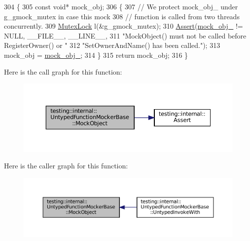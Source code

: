\begin{DoxyCode}
304                                         \{
305   \textcolor{keyword}{const} \textcolor{keywordtype}{void}* mock\_obj;
306   \{
307     \textcolor{comment}{// We protect mock\_obj\_ under g\_gmock\_mutex in case this mock}
308     \textcolor{comment}{// function is called from two threads concurrently.}
309     \hyperlink{namespacetesting_1_1internal_a08b187c6cc4e28400aadf9a32fccc8de}{MutexLock} l(&g\_gmock\_mutex);
310     \hyperlink{namespacetesting_1_1internal_a7a259643b7f2d23ce2b757728df42c99}{Assert}(\hyperlink{classtesting_1_1internal_1_1UntypedFunctionMockerBase_adf35c589969bb985668616031cb9ed56}{mock\_obj\_} != NULL, \_\_FILE\_\_, \_\_LINE\_\_,
311            \textcolor{stringliteral}{"MockObject() must not be called before RegisterOwner() or "}
312            \textcolor{stringliteral}{"SetOwnerAndName() has been called."});
313     mock\_obj = \hyperlink{classtesting_1_1internal_1_1UntypedFunctionMockerBase_adf35c589969bb985668616031cb9ed56}{mock\_obj\_};
314   \}
315   \textcolor{keywordflow}{return} mock\_obj;
316 \}
\end{DoxyCode}
Here is the call graph for this function\+:
\nopagebreak
\begin{figure}[H]
\begin{center}
\leavevmode
\includegraphics[width=350pt]{classtesting_1_1internal_1_1UntypedFunctionMockerBase_a71863dd67193a7082078d5b366d5ce51_cgraph}
\end{center}
\end{figure}
Here is the caller graph for this function\+:
\nopagebreak
\begin{figure}[H]
\begin{center}
\leavevmode
\includegraphics[width=350pt]{classtesting_1_1internal_1_1UntypedFunctionMockerBase_a71863dd67193a7082078d5b366d5ce51_icgraph}
\end{center}
\end{figure}
\mbox{\label{classtesting_1_1internal_1_1UntypedFunctionMockerBase_ae90a5b5d48db1e99634bc6ff39ded335}} 
